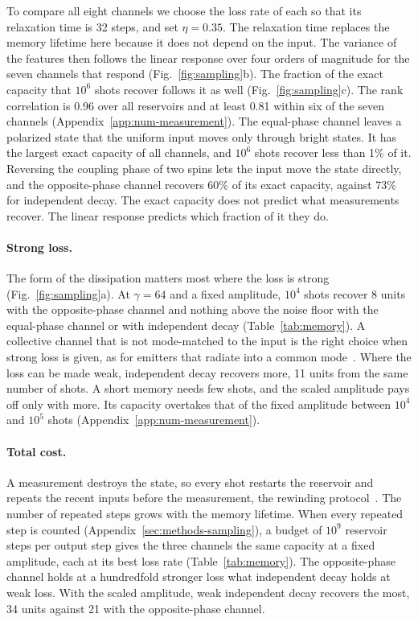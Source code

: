 To compare all eight channels we choose the loss rate of each so that its relaxation time is 32 steps, and set
$\eta=0.35$. The relaxation time replaces the memory lifetime here because it does not depend on the input. The
variance of the features then follows the linear response over four orders of magnitude for the seven channels that
respond (Fig.~\ref{fig:sampling}b). The fraction of the exact capacity that $10^6$ shots recover follows it as well
(Fig.~\ref{fig:sampling}c). The rank correlation is 0.96 over all reservoirs and at least 0.81 within six of the
seven channels (Appendix~\ref{app:num-measurement}). The equal-phase channel leaves a polarized state that the
uniform input moves only through bright states. It has the largest exact capacity of all channels, and $10^6$ shots
recover less than 1\% of it. Reversing the coupling phase of two spins lets the input move the state directly, and
the opposite-phase channel recovers 60\% of its exact capacity, against 73\% for independent decay. The exact
capacity does not predict what measurements recover. The linear response predicts which fraction of it they do.

\paragraph{Strong loss.}
The form of the dissipation matters most where the loss is strong (Fig.~\ref{fig:sampling}a). At $\gamma=64$ and a
fixed amplitude, $10^4$ shots recover 8 units with the opposite-phase channel and nothing above the noise floor with
the equal-phase channel or with independent decay (Table~\ref{tab:memory}). A collective channel that is not
mode-matched to the input is the right choice when strong loss is given, as for emitters that radiate into a common
mode~\cite{Dicke1954,AsenjoGarcia2017,Facchinetti2016}. Where the loss can be made weak, independent decay recovers
more, 11 units from the same number of shots. A short memory needs few shots, and the scaled amplitude pays off only
with more. Its capacity overtakes that of the fixed amplitude between $10^4$ and $10^5$ shots
(Appendix~\ref{app:num-measurement}).

\paragraph{Total cost.}
A measurement destroys the state, so every shot restarts the reservoir and repeats the recent inputs before the
measurement, the rewinding protocol~\cite{Mujal2023,Cindrak2024}. The number of repeated steps grows with the memory
lifetime. When every repeated step is counted (Appendix~\ref{sec:methods-sampling}), a budget of $10^9$ reservoir
steps per output step gives the three channels the same capacity at a fixed amplitude, each at its best loss rate
(Table~\ref{tab:memory}). The opposite-phase channel holds at a hundredfold stronger loss what independent decay
holds at weak loss. With the scaled amplitude, weak independent decay recovers the most, 34 units against 21 with
the opposite-phase channel.

